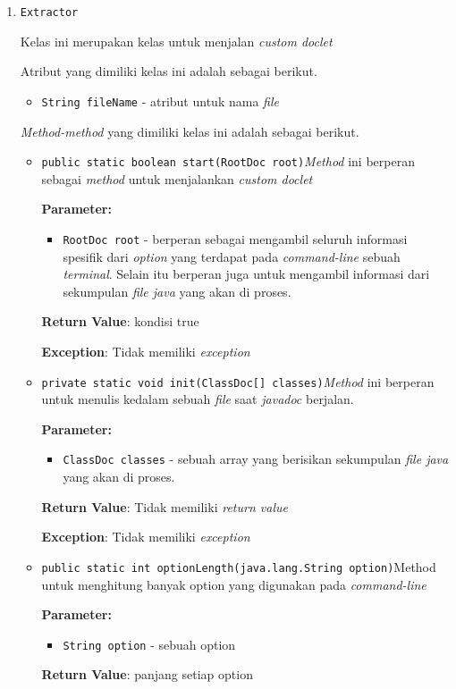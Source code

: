 \documentclass{article}
\begin{document}
\begin{enumerate}
\begin{itemize}
\end{itemize}
\item \texttt{Extractor}

Kelas ini merupakan kelas untuk menjalan \textit{custom doclet}

Atribut yang dimiliki kelas ini adalah sebagai berikut.
\begin{itemize}
\item \texttt{String fileName} - atribut untuk nama \textit{file}
\end{itemize}
\textit{Method-method} yang dimiliki kelas ini adalah sebagai berikut.
\begin{itemize}
\item \texttt{public static boolean start(RootDoc root)}\textit{Method} ini berperan sebagai \textit{method} untuk menjalankan
 \textit{custom doclet}

\textbf{Parameter:}
\begin{itemize}
\item \texttt{RootDoc root} - 
berperan sebagai mengambil seluruh informasi spesifik dari
             \textit{option} yang terdapat pada \textit{command-line} sebuah
             \textit{terminal}. Selain itu berperan juga untuk mengambil informasi dari
             sekumpulan \textit{file java} yang akan di proses.
\end{itemize}
\textbf{Return Value}: kondisi true

\textbf{Exception}: Tidak memiliki \textit{exception}

\item \texttt{private static void init(ClassDoc[] classes)}\textit{Method} ini berperan untuk menulis kedalam sebuah \textit{file}
 saat \textit{javadoc} berjalan.

\textbf{Parameter:}
\begin{itemize}
\item \texttt{ClassDoc classes} - 
sebuah array yang berisikan sekumpulan \textit{file java}
                yang akan di proses.
\end{itemize}
\textbf{Return Value}: Tidak memiliki \textit{return value}

\textbf{Exception}: Tidak memiliki \textit{exception}

\item \texttt{public static int optionLength(java.lang.String option)}Method untuk menghitung banyak option yang digunakan pada
 \textit{command-line}

\textbf{Parameter:}
\begin{itemize}
\item \texttt{String option} - 
sebuah option
\end{itemize}
\textbf{Return Value}: panjang setiap option


\end{itemize}
\end{enumerate}
\end{document}
